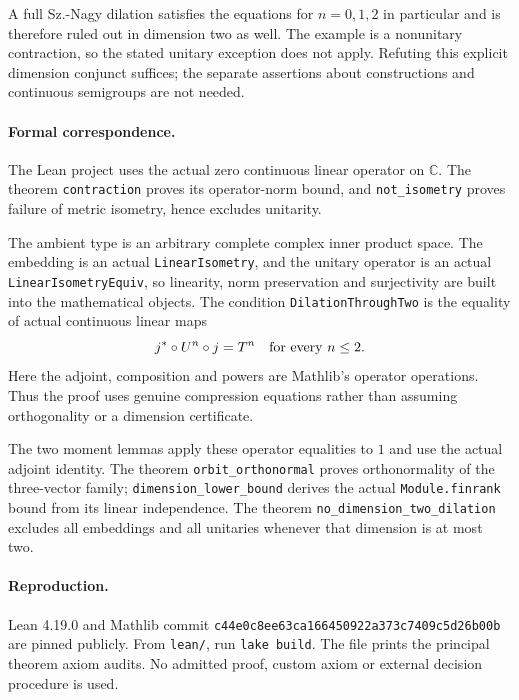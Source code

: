 \documentclass[11pt]{article}
\begin{document}
A full Sz.-Nagy dilation satisfies the equations for $n=0,1,2$ in particular and is therefore ruled out in dimension two as well. The example is a nonunitary contraction, so the stated unitary exception does not apply. Refuting this explicit dimension conjunct suffices; the separate assertions about constructions and continuous semigroups are not needed.

\paragraph{Formal correspondence.}
The Lean project uses the actual zero continuous linear operator on $\mathbb C$. The theorem \texttt{contraction} proves its operator-norm bound, and \texttt{not\_isometry} proves failure of metric isometry, hence excludes unitarity.

The ambient type is an arbitrary complete complex inner product space. The embedding is an actual \texttt{LinearIsometry}, and the unitary operator is an actual \texttt{LinearIsometryEquiv}, so linearity, norm preservation and surjectivity are built into the mathematical objects. The condition \texttt{DilationThroughTwo} is the equality of actual continuous linear maps
\[
j^*\circ U^n\circ j=T^n\quad\hbox{for every }n\leq2.
\]
Here the adjoint, composition and powers are Mathlib's operator operations. Thus the proof uses genuine compression equations rather than assuming orthogonality or a dimension certificate.

The two moment lemmas apply these operator equalities to $1$ and use the actual adjoint identity. The theorem \texttt{orbit\_orthonormal} proves orthonormality of the three-vector family; \texttt{dimension\_lower\_bound} derives the actual \texttt{Module.finrank} bound from its linear independence. The theorem \texttt{no\_dimension\_two\_dilation} excludes all embeddings and all unitaries whenever that dimension is at most two.

\paragraph{Reproduction.}
Lean 4.19.0 and Mathlib commit \texttt{c44e0c8ee63ca166450922a373c7409c5d26b00b} are pinned publicly. From \texttt{lean/}, run \texttt{lake build}. The file prints the principal theorem axiom audits. No admitted proof, custom axiom or external decision procedure is used.
\end{document}

